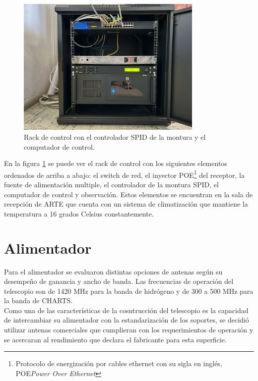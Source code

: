 \begin{figure}
    \centering
    \includegraphics[width=0.8\textwidth]{img/rack}
    \caption{Rack de control con el controlador SPID de la montura y el computador de control.}
    \label{fig:ensamble12}
\end{figure}

En la figura \ref{fig:ensamble12} se puede ver el rack de control con los siguientes elementos ordenados de arriba a abajo: el switch de red, el inyector POE\footnote{Protocolo de energización por cables ethernet con su sigla en inglés, POE\textit{Power Over Ethernet}} del receptor, la fuente de alimentación multiple, el controlador de la montura SPID, el computador de control y observación. Estos elementos se encuentran en la sala de recepción de ARTE que cuenta con un sistema de climatización que mantiene la temperatura a 16 grados Celsius constantemente.\\

\section{Alimentador}

Para el alimentador se evaluaron distintas opciones de antenas según su desempeño de ganancia y ancho de banda. Las frecuencias de operación del telescopio son de 1420 MHz para la banda de hidrógeno y de 300 a 500 MHz para la banda de CHARTS.\\

Como una de las características de la cosntrucción del telescopio es la capacidad de intercambiar su alimentador con la estandarización de los soportes, se decidió utilizar antenas comerciales que cumplieran con los requerimientos de operación y se acercaran al rendimiento que declara el fabricante para esta superficie.\\

